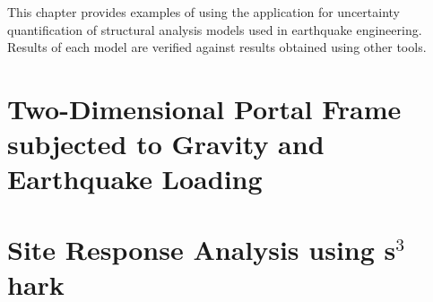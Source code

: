 This chapter provides examples of using the \texttt{\getsoftwarename{}} application for uncertainty
quantification of structural analysis models used in earthquake
engineering. Results of each model are verified against results
obtained using other tools.\\

\section{Two-Dimensional Portal Frame subjected to Gravity and Earthquake Loading}



\section{Site Response Analysis using s$^3$hark}

